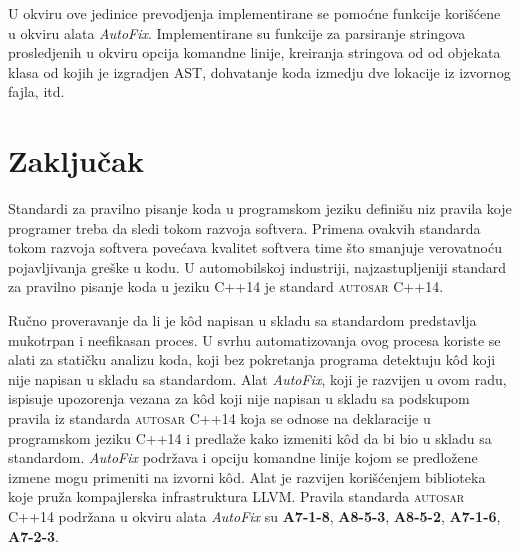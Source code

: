 \documentclass[12pt,oneside]{memoir}
\begin{document}
U okviru ove jedinice prevodjenja implementirane se pomo\'{c}ne funkcije kori\v{s}\'{c}ene u okviru alata \textit{AutoFix}.
Implementirane su funkcije za parsiranje stringova prosledjenih u okviru opcija komandne linije, kreiranja stringova od 
od objekata klasa od kojih je izgradjen AST, dohvatanje koda izmedju dve lokacije iz izvornog fajla, itd.






\chapter{Zaključak}

Standardi za pravilno pisanje koda u programskom jeziku defini\v{s}u niz pravila koje programer treba da sledi tokom razvoja softvera. Primena ovakvih standarda
tokom razvoja softvera pove\'{c}ava kvalitet softvera time \v{s}to smanjuje verovatno\'{c}u pojavljivanja gre\v{s}ke u kodu. U automobilskoj industriji,
najzastupljeniji standard za pravilno pisanje koda u jeziku C++14 je standard \textsc{autosar} C++14.
\par
Ru\v{c}no proveravanje da li je k\^{o}d napisan u skladu sa standardom predstavlja mukotrpan i neefikasan proces. U svrhu automatizovanja ovog procesa
koriste se alati za stati\v{c}ku analizu koda, koji bez pokretanja programa detektuju k\^{o}d koji nije napisan u skladu sa standardom. Alat \textit{AutoFix}, koji je razvijen u ovom radu, ispisuje upozorenja vezana za k\^{o}d koji nije napisan u skladu sa podskupom pravila iz standarda \textsc{autosar} C++14 koja se odnose na deklaracije u programskom jeziku C++14 i predla\v{z}e kako izmeniti k\^{o}d da bi bio u skladu sa standardom. \textit{AutoFix} podr\v{z}ava i opciju komandne linije kojom se predlo\v{z}ene izmene mogu primeniti na izvorni k\^{o}d. Alat je razvijen kori\v{s}\'{c}enjem biblioteka koje pru\v{z}a kompajlerska infrastruktura LLVM. Pravila standarda \textsc{autosar} C++14 podr\v{z}ana u okviru alata \textit{AutoFix} su \textbf{A7-1-8}, \textbf{A8-5-3}, \textbf{A8-5-2}, \textbf{A7-1-6}, \textbf{A7-2-3}.
\end{document}
